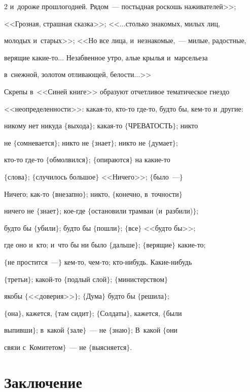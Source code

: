 \begin{multicols}{2}
и~дороже прошлогодней. Рядом~--- постыдная роскошь наживателей>>; 


<<Грозная, страш\-ная сказка>>; <<$\ldots$столько знакомых, милых лиц, 


молодых и~старых>>; <<Но все лица, и~незнакомые,~--- милые, радостные, 


верящие ка\-кие-то$\ldots$ Незабвенное утро, алые \mbox{крылья} и~марсельеза 


в~снежной, золотом отливающей, белости$\ldots$>>


     


     Скрепы в~<<Синей книге>> образуют отчетливое тематическое гнездо 


<<неопределенности>>: какая-то, кто-то где-то, будто бы, кем-то и~другие:


никому нет никуда $\{$выхода$\}$; какая-то $\{$ЧРЕВАТОСТЬ$\}$; никто 


не $\{$сомневается$\}$; никто не $\{$знает$\}$; никто не $\{$думает$\}$; 


кто-то где-то $\{$обмолвился$\}$; $\{$опираются$\}$ на ка\-кие-то 


$\{$слова$\}$; $\{$случилось большое$\}$ <<Ничего>>; $\{$было~---$\}$ 


Ничего; как-то $\{$внезапно$\}$; никто, $\{$конечно, в~точ\-ности$\}$ 


ничего не $\{$знает$\}$; кое-где $\{$остановили трамваи (и~разбили)$\}$; 


будто бы $\{$убили$\}$; будто бы $\{$пошли$\}$; $\{$все$\}$ <<будто бы>>; 


где оно и~кто; и~что бы ни было $\{$дальше$\}$; $\{$верящие$\}$ ка\-кие-то; 


$\{$не прос\-тит\-ся~---$\}$ кем-то, чем-то; кто-ни\-будь. Ка\-кие-ни\-будь 


$\{$третьи$\}$; ка\-кой-то $\{$подлый слой$\}$; $\{$министерством$\}$ 


якобы $\{$<<доверия>>$\}$; $\{$Дума$\}$ будто бы $\{$решила$\}$; 


$\{$она$\}$, кажется, $\{$там сидит$\}$; $\{$Солдаты$\}$, кажется, $\{$были 


выпивши$\}$; в~какой $\{$зале$\}$~--- не $\{$знаю$\}$; В~какой $\{$они 


связи с~Комитетом$\}$~--- не $\{$выясняется$\}$.


    


   \section{Заключение}



\end{multicols}
